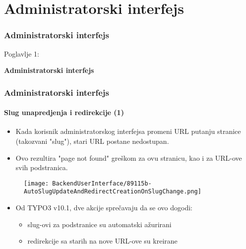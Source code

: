 %

\section{Administratorski interfejs}
\begin{frame}[fragile]
	\frametitle{Administratorski interfejs}

	\begin{center}\huge{Poglavlje 1:}\end{center}
	\begin{center}\huge{\color{typo3darkgrey}\textbf{Administratorski interfejs}}\end{center}

\end{frame}


\begin{frame}[fragile]
	\frametitle{Administratorski interfejs}
	\framesubtitle{Slug unapredjenja i redirekcije (1)}

	\begin{itemize}
		\item Kada korisnik administratorskog interfejsa promeni URL putanju stranice
			(takozvani "slug"), stari URL postane nedostupan.
		\item Ovo rezultira "page not found" greškom za ovu stranicu, kao i za URL-ove
			svih podstranica.
	\end{itemize}

	\begin{figure}
		\texttt{[image: BackendUserInterface/89115b-AutoSlugUpdateAndRedirectCreationOnSlugChange.png]}
	\end{figure}

	\begin{itemize}
		\item Od TYPO3 v10.1, dve akcije sprečavaju da se ovo dogodi:

			\begin{itemize}
				\item slug-ovi za podstranice su automatski ažurirani
				\item redirekcije sa starih na nove URL-ove su kreirane
			\end{itemize}

	\end{itemize}

\end{frame}

